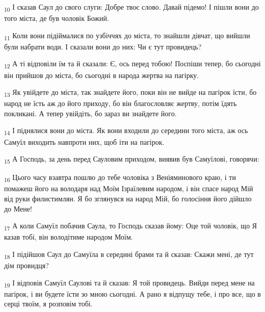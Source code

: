 \begin{tcolorbox}
\textsubscript{10} І сказав Саул до свого слуги: Добре твоє слово. Давай підемо! І пішли вони до того міста, де був чоловік Божий.
\end{tcolorbox}
\begin{tcolorbox}
\textsubscript{11} Коли вони підіймалися по узбіччях до міста, то знайшли дівчат, що вийшли були набрати води. І сказали вони до них: Чи є тут провидець?
\end{tcolorbox}
\begin{tcolorbox}
\textsubscript{12} А ті відповіли їм та й сказали: Є, ось перед тобою! Поспіши тепер, бо сьогодні він прийшов до міста, бо сьогодні в народа жертва на пагірку.
\end{tcolorbox}
\begin{tcolorbox}
\textsubscript{13} Як увійдете до міста, так знайдете його, поки він не вийде на пагірок їсти, бо народ не їсть аж до його приходу, бо він благословляє жертву, потім їдять покликані. А тепер увійдіть, бо зараз ви знайдете його.
\end{tcolorbox}
\begin{tcolorbox}
\textsubscript{14} І піднялися вони до міста. Як вони входили до середини того міста, аж ось Самуїл виходить навпроти них, щоб іти на пагірок.
\end{tcolorbox}
\begin{tcolorbox}
\textsubscript{15} А Господь, за день перед Сауловим приходом, виявив був Самуїлові, говорячи:
\end{tcolorbox}
\begin{tcolorbox}
\textsubscript{16} Цього часу взавтра пошлю до тебе чоловіка з Веніяминового краю, і ти помажеш його на володаря над Моїм Ізраїлевим народом, і він спасе народ Мій від руки филистимлян. Я бо зглянувся на народ Мій, бо голосіння його дійшло до Мене!
\end{tcolorbox}
\begin{tcolorbox}
\textsubscript{17} А коли Самуїл побачив Саула, то Господь сказав йому: Оце той чоловік, що Я казав тобі, він володітиме народом Моїм.
\end{tcolorbox}
\begin{tcolorbox}
\textsubscript{18} І підійшов Саул до Самуїла в середині брами та й сказав: Скажи мені, де тут дім провидця?
\end{tcolorbox}
\begin{tcolorbox}
\textsubscript{19} І відповів Самуїл Саулові та й сказав: Я той провидець. Вийди перед мене на пагірок, і ви будете їсти зо мною сьогодні. А рано я відпущу тебе, і про все, що в серці твоїм, я розповім тобі.
\end{tcolorbox}
